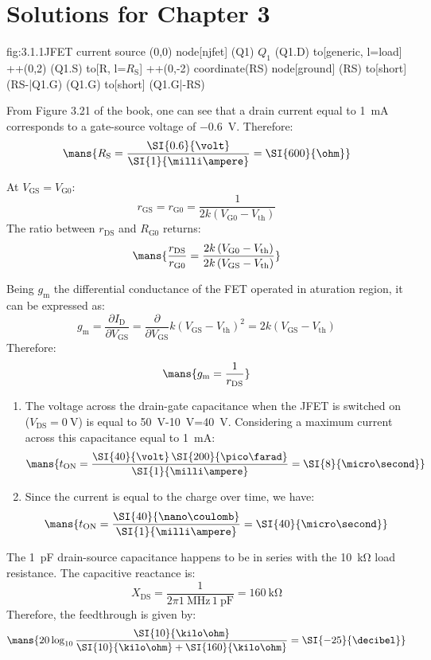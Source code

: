 \chapter{Solutions for Chapter 3}

\begin{circuit}{fig:3.1.1}{JFET current source}
    (0,0) node[njfet] (Q1) {$Q_1$}
    (Q1.D) to[generic, l=load] ++(0,2)
    (Q1.S) to[R, l=$R_\text{S}$] ++(0,-2) coordinate(RS)
    node[ground] {}
    (RS) to[short] (RS-|Q1.G)
    (Q1.G) to[short] (Q1.G|-RS)
\end{circuit}

From Figure 3.21 of the book, one can see that a drain current equal to \SI{1}{\milli\ampere} corresponds to a gate-source voltage of \SI{-0.6}{\volt}.
Therefore:
\[\mans{R_\text{S}=\frac{\SI{0.6}{\volt}}{\SI{1}{\milli\ampere}}=\SI{600}{\ohm}}\]

At $V_\text{GS}=V_\text{G0}$:
\[r_\text{GS}=r_\text{G0}=\frac{1}{2k\left(V_\text{G0}-V_\text{th}\right)}\]
The ratio between $r_\text{DS}$ and $R_\text{G0}$ returns:
\[\mans{\frac{r_\text{DS}}{r_\text{G0}}=\frac{2k\left(V_\text{G0}-V_\text{th}\right)}{2k\left(V_\text{GS}-V_\text{th}\right)}}\]

Being $g_\text{m}$ the differential conductance of the FET operated in aturation region, it can be expressed as:
\[g_\text{m}=\frac{\partial I_\text{D}}{\partial V_\text{GS}}=\frac{\partial}{\partial V_\text{GS}}k\left(V_\text{GS}-V_\text{th}\right)^2=2k\left(V_\text{GS}-V_\text{th}\right)\]
Therefore:
\[\mans{g_\text{m}=\frac{1}{r_\text{DS}}}\]

\begin{enumerate}
    \item The voltage across the drain-gate capacitance when the JFET is switched on ($V_\text{DS}=\SI{0}{\volt}$) is equal to \SI{50}{\volt}-\SI{10}{\volt}=\SI{40}{\volt}. Considering a maximum current across this capacitance equal to \SI{1}{\milli\ampere}:
    \[\mans{t_\text{ON}=\frac{\SI{40}{\volt}\,\SI{200}{\pico\farad}}{\SI{1}{\milli\ampere}}=\SI{8}{\micro\second}}\]
    \item Since the current is equal to the charge over time, we have:
    \[\mans{t_\text{ON}=\frac{\SI{40}{\nano\coulomb}}{\SI{1}{\milli\ampere}}=\SI{40}{\micro\second}}\]
\end{enumerate}

The \SI{1}{\pico\farad} drain-source capacitance happens to be in series with the \SI{10}{\kilo\ohm} load resistance. The capacitive reactance is:
\[X_\text{DS}=\frac{1}{2\pi\SI{1}{\mega\hertz}\,\SI{1}{\pico\farad}}=\SI{160}{\kilo\ohm}\]
Therefore, the feedthrough is given by:
\[\mans{20\log_{10}\frac{\SI{10}{\kilo\ohm}}{\SI{10}{\kilo\ohm}+\SI{160}{\kilo\ohm}}=\SI{-25}{\decibel}}\]

